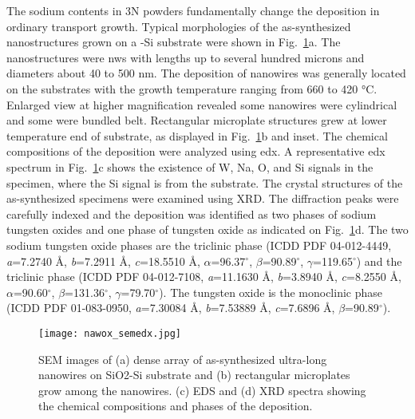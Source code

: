 The sodium contents in 3N powders fundamentally change the deposition in ordinary transport growth. Typical morphologies of the as-synthesized nanostructures grown on a -Si substrate were shown in Fig.~\ref{fig:nawoxsemedx}a. The nanostructures were \glspl{nw} with lengths up to several hundred microns and diameters about 40 to 500 nm. The deposition of nanowires was generally located on the substrates with the growth temperature ranging from 660 to 420 \si{\degreeCelsius}. Enlarged view at higher magnification revealed some nanowires were cylindrical and some were bundled belt. Rectangular microplate structures grew at lower temperature end of substrate, as displayed in Fig.~\ref{fig:nawoxsemedx}b and inset. The chemical compositions of the deposition were analyzed using \gls{edx}. A representative \gls{edx} spectrum in Fig.~\ref{fig:nawoxsemedx}c shows the existence of W, Na, O, and Si signals in the specimen, where the Si signal is from the substrate. The crystal structures of the as-synthesized specimens were examined using XRD. The diffraction peaks were carefully indexed and the deposition was identified as two phases of sodium tungsten oxides and one phase of tungsten oxide as indicated on Fig.~\ref{fig:nawoxsemedx}d. The two sodium tungsten oxide phases are the triclinic  phase (ICDD PDF 04-012-4449, \emph{a}=7.2740 \AA, \emph{b}=7.2911 \AA, \emph{c}=18.5510 \AA, $\alpha$=96.37$^\circ$, $\beta$=90.89$^\circ$, $\gamma$=119.65$^\circ$) and the triclinic  phase (ICDD PDF 04-012-7108, \emph{a}=11.1630 \AA, \emph{b}=3.8940 \AA, \emph{c}=8.2550 \AA, $\alpha$=90.60$^\circ$, $\beta$=131.36$^\circ$, $\gamma$=79.70$^\circ$). The tungsten oxide is the monoclinic  phase (ICDD PDF 01-083-0950, \emph{a}=7.30084 \AA, \emph{b}=7.53889 \AA, \emph{c}=7.6896 \AA, $\beta$=90.89$^\circ$).

\begin{figure}[htb]
\centering
\texttt{[image: nawox\_semedx.jpg]}
\caption[SEM and EDX on ]{SEM images of (a) dense array of as-synthesized ultra-long nanowires on SiO2-Si substrate and (b) rectangular microplates grow among the nanowires. (c) EDS and (d) XRD spectra showing the chemical compositions and phases of the deposition.}
\label{fig:nawoxsemedx}
\end{figure}


